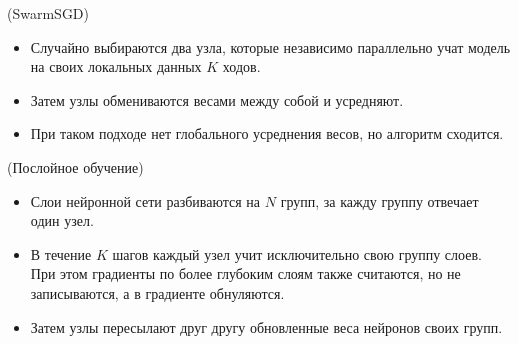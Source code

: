 \begin{algorithm}(SwarmSGD)
  \begin{itemize}
    \item Случайно выбираются два узла, которые независимо параллельно
      учат модель на своих локальных данных $K$ ходов.
    \item Затем узлы обмениваются весами между собой и усредняют.
    \item При таком подходе нет глобального усреднения весов, но алгоритм
      сходится.
  \end{itemize}
\end{algorithm}

\begin{algorithm}(Послойное обучение)
  \begin{itemize}
    \item Слои нейронной сети разбиваются на $N$ групп, за кажду группу отвечает
      один узел.
    \item В течение $K$ шагов каждый узел учит исключительно свою группу слоев.
      При этом градиенты по более глубоким слоям также считаются, но не
      записываются, а в градиенте обнуляются.
    \item Затем узлы пересылают друг другу обновленные веса нейронов своих
      групп.
  \end{itemize}
\end{algorithm}
